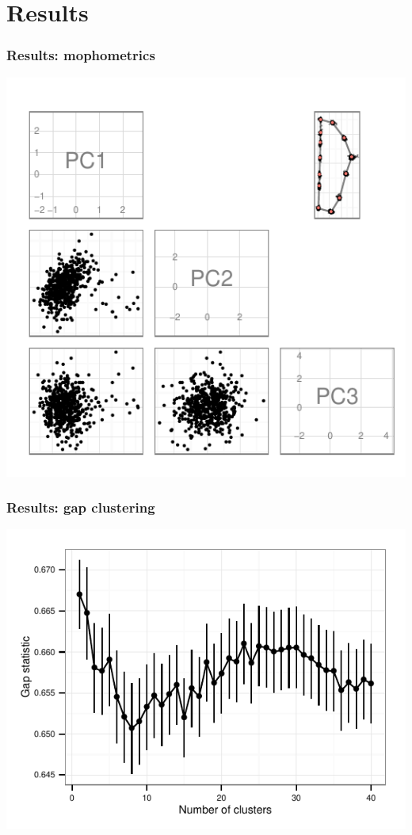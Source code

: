 \documentclass{beamer}\usepackage{graphicx, color}
\makeatletter
\def\maxwidth{ %
  \ifdim\Gin@nat@width>\linewidth
    \linewidth
  \else
    \Gin@nat@width
  \fi
}
\newenvironment{knitrout}{}{} %
\makeatother
\begin{document}
\section{Results}
\begin{frame}[fragile]
  \frametitle{Results: mophometrics}
\begin{knitrout}
\color{fgcolor}
\includegraphics[width=\maxwidth]{figure/gm} 

\end{knitrout}


\end{frame}

\begin{frame}[fragile]
  \frametitle{Results: gap clustering}
\begin{knitrout}
\color{fgcolor}
\includegraphics[width=\maxwidth]{figure/gap} 

\end{knitrout}

\end{frame}
\end{document}
